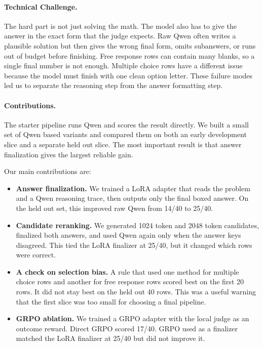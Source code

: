 \documentclass[11pt]{article}
\begin{document}
\paragraph{Technical Challenge.}
The hard part is not just solving the math. The model also has to give the answer in the exact form that the judge expects. Raw Qwen often writes a plausible solution but then gives the wrong final form, omits subanswers, or runs out of budget before finishing. Free response rows can contain many blanks, so a single final number is not enough. Multiple choice rows have a different issue because the model must finish with one clean option letter. These failure modes led us to separate the reasoning step from the answer formatting step.

\paragraph{Contributions.}
The starter pipeline runs Qwen and scores the result directly. We built a small set of Qwen based variants and compared them on both an early development slice and a separate held out slice. The most important result is that answer finalization gives the largest reliable gain.

Our main contributions are:
\begin{itemize}
  \item \textbf{Answer finalization.} We trained a LoRA adapter that reads the problem and a Qwen reasoning trace, then outputs only the final boxed answer. On the held out set, this improved raw Qwen from 14/40 to 25/40.
  \item \textbf{Candidate reranking.} We generated 1024 token and 2048 token candidates, finalized both answers, and used Qwen again only when the answer keys disagreed. This tied the LoRA finalizer at 25/40, but it changed which rows were correct.
  \item \textbf{A check on selection bias.} A rule that used one method for multiple choice rows and another for free response rows scored best on the first 20 rows. It did not stay best on the held out 40 rows. This was a useful warning that the first slice was too small for choosing a final pipeline.
  \item \textbf{GRPO ablation.} We trained a GRPO adapter with the local judge as an outcome reward. Direct GRPO scored 17/40. GRPO used as a finalizer matched the LoRA finalizer at 25/40 but did not improve it.
\end{itemize}
\end{document}
